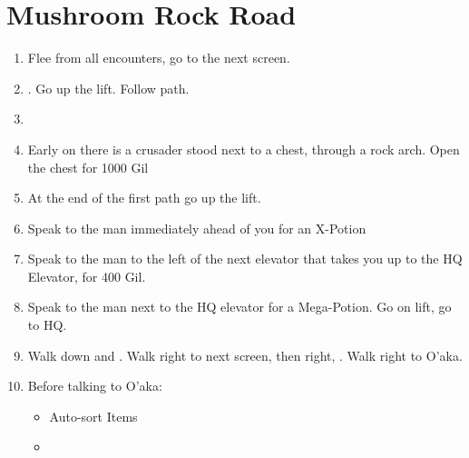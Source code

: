 \chapter{Mushroom Rock Road}
\begin{enumerate}
	\item Flee from all encounters, go to the next screen.
	\item \save. Go up the lift. Follow path.
	\item \formation{\tidus}{\wakka}{\auron}
	\item Early on there is a crusader stood next to a chest, through a rock arch. Open the chest for 1000 Gil
	\item At the end of the first path go up the lift.
	\item Speak to the man immediately ahead of you for an X-Potion
	\item Speak to the man to the left of the next elevator that takes you up to the HQ Elevator, for 400 Gil.
	\item Speak to the man next to the HQ elevator for a Mega-Potion. Go on lift, go to HQ.
	\item Walk down and \sd. Walk right to next screen, then right, \sd. Walk right to O'aka.
	\item Before talking to O'aka:
	\begin{itemize}
		\item Auto-sort Items
		\item \formation{\tidus}{\wakka}{\yuna}
	\end{itemize}
\end{enumerate}
